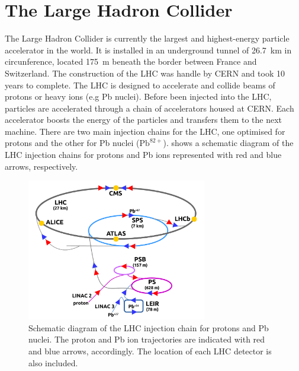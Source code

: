 \section{The Large Hadron Collider}\label{sec:Introduction_Experiment_LHC}

The Large Hadron Collider is currently the largest and highest-energy particle accelerator in the world. It is installed in an underground tunnel of \SI{26.7}{\km} in circunference, located \SI{175}{\m} beneath the border between France and Switzerland. The construction of the LHC was handle by CERN and took 10 years to complete. The LHC is designed to accelerate and collide beams of protons or heavy ions (e.g Pb nuclei). Before been injected into the LHC, particles are accelerated through a chain of accelerators housed at CERN. Each accelerator boosts the energy of the particles and transfers them to the next machine. There are two main injection chains for the LHC, one optimised for protons and the other for Pb nuclei ($\mathrm{Pb}^{82+}$).  shows a schematic diagram of the LHC injection chains for protons and Pb ions represented with red and blue arrows, respectively.

\begin{figure}[!htbp]
 \begin{center}
  \includegraphics[width=0.7\textwidth]{Figures/Experiment/LHC/LHCInjectionChain.png}
 \end{center}
 \caption{Schematic diagram of the LHC injection chain for protons and Pb nuclei. The proton and Pb ion trajectories are indicated with red and blue arrows, accordingly. The location of each LHC detector is also included. }
 \label{fig:LHCInjectionChain}
\end{figure}

